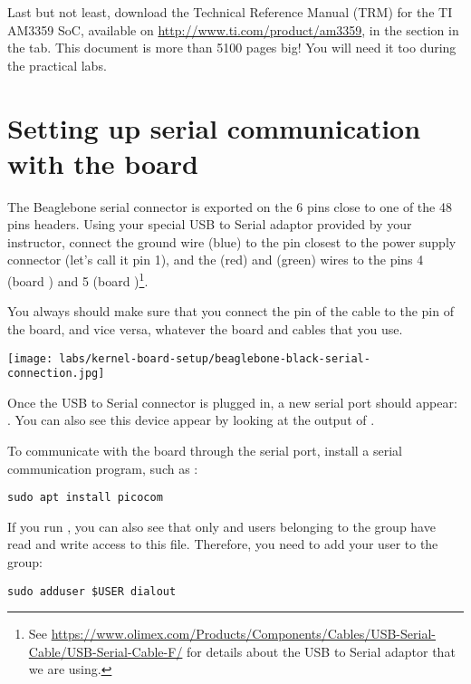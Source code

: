 Last but not least, download the Technical Reference Manual (TRM) for
the TI AM3359 SoC, available on \url{http://www.ti.com/product/am3359},
in the  section in the  tab.
This document is more than 5100 pages big! You will need it
too during the practical labs.

\section{Setting up serial communication with the board}

The Beaglebone serial connector is exported on the 6 pins close to one
of the 48 pins headers. Using your special USB to Serial adaptor provided
by your instructor, connect the ground wire (blue) to the pin closest
to the power supply connector (let's call it pin 1), and the  (red)
and  (green) wires to the pins 4 (board ) and
5 (board )\footnote{See
\url{https://www.olimex.com/Products/Components/Cables/USB-Serial-Cable/USB-Serial-Cable-F/}
for details about the USB to Serial adaptor that we are using.}.

You always should make sure that you connect the  pin of the cable
to the  pin of the board, and vice versa, whatever the board and
cables that you use.

\begin{center}
\texttt{[image: labs/kernel-board-setup/beaglebone-black-serial-connection.jpg]}
\end{center}

Once the USB to Serial connector is plugged in, a new serial port
should appear: .  You can also see this device
appear by looking at the output of .

To communicate with the board through the serial port, install a
serial communication program, such as :

\begin{verbatim}
sudo apt install picocom
\end{verbatim}

If you run , you can also see that only
 and users belonging to the  group have
read and write access to this file. Therefore, you need to add your user
to the  group:

\begin{verbatim}
sudo adduser $USER dialout
\end{verbatim}

